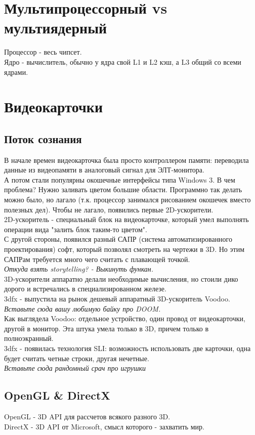 \documentclass[12pt, a4paper]{article}
\begin{document}
\section{Мультипроцессорный vs мультиядерный}
Процессор - весь чипсет.\\
Ядро - вычислитель, обычно у ядра свой L1 и L2 кэш, а L3 общий со всеми ядрами.
\section{Видеокарточки}
\subsection{Поток сознания}
В начале времен видеокарточка была просто контроллером памяти: переводила данные из видеопамяти в аналоговый сигнал для ЭЛТ-монитора.\\
А потом стали популярны окошечные интерфейсы типа Windows 3. В чем проблема? Нужно заливать цветом большие области. Программно так делать можно было, но лагало (т.к. процессор занимался рисованием окошечек вместо полезных дел). Чтобы не лагало, появились первые 2D-ускорители.\\
2D-ускоритель - специальный блок на видеокарточке, который умел выполнять операции вида "залить блок таким-то цветом".\\
С другой стороны, появился разный САПР (система автоматизированного проектирования) софт, который позволял смотреть на чертежи в 3D. Но этим САПРам требуется много чего считать с плавающей точкой.\\
\textit{Откуда взять storytelling? - Выкинуть функан.}\\
3D-ускорители аппаратно делали необходимые вычисления, но стоили дико дорого и встречались в специализированном железе.\\
3dfx - выпустила на рынок дешевый аппаратный 3D-ускоритель Voodoo.\\
\textit{Вставьте сюда вашу любимую байку про DOOM.}\\
Как выглядела Voodoo: отдельное устройство, один провод от видеокарточки, другой в монитор. Эта штука умела только в 3D, причем только в полноэкранный.\\
3dfx - появилась технология SLI: возможность использовать две карточки, одна будет считать четные строки, другая нечетные.\\
\textit{Вставьте сюда рандомный срач про игрушки}
\subsection{OpenGL \& DirectX}
OpenGL - 3D API для рассчетов всякого разного 3D.\\
DirectX - 3D API от Microsoft, смысл которого - захватить мир.\\
\end{document}
